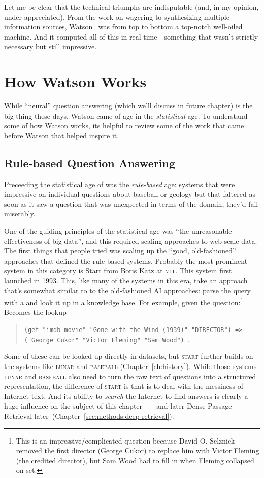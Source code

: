 Let me be clear that the technical triumphs are indisputable (and, in
my opinion, under-appreciated).
%
From the work on wagering to synthesizing multiple information sources,
Watson~\citep{ferruci-10} was from top to bottom a top-notch well-oiled
machine.
%
And it computed all of this in real time---something that wasn't
strictly necessary but still impressive.

\section{How Watson Works}

While ``neural'' question answering (which we'll discuss in future
chapter) is the big thing these days, Watson came of age in the
\emph{statistical} age.
%
To understand some of how Watson works, its helpful to review some of
the work that came before Watson that helped inspire it.

\subsection{Rule-based Question Answering}

Preceeding the statistical age of  was the \emph{rule-based}
age: systems that were impressive on individual questions about
baseball or geology but that faltered as soon as it saw a question
that was unexpected in terms of the domain, they'd fail miserably.

One of the guiding principles of the statistical age was ``the
unreasonable effectiveness of big data'', and this required scaling 
approaches to web-scale data.
%
The first things that people tried was scaling up the ``good,
old-fashioned'' approaches that defined the rule-based systems.
%
Probably the most prominent system in this category is Start from Boris Katz
at \textsc{mit}.  This system first launched in 1993.
%
This, like many of the systems in
this era, take an approach that’s somewhat similar to to the old-fashioned AI
approaches: parse the query with a and look it up in a knowledge base.
%
For example, given the question:\footnote{This is an impressive/complicated question
    because David O. Selznick removed the first director (George Cukor) to
    replace him with Victor Fleming (the credited director), but Sam Wood had
    to fill in when Fleming collapsed on set.}
%
%
Becomes the lookup
\begin{quote}
  \texttt{(get "imdb-movie" "Gone with the Wind (1939)" "DIRECTOR") =>
    ("George Cukor" "Victor Fleming" "Sam Wood")}~\citep{katz-02}.
\end{quote}
%
Some of these can be looked up directly in datasets, but \textsc{start}
further builds on the systems like \textsc{lunar} and \textsc{baseball}
(Chapter~\ref{ch:history}).
%
While those systems \textsc{lunar} and
\textsc{baseball} also need to turn the raw text of questions into a structured
representation, the difference of \textsc{start} is that
is to deal with the
messiness of Internet text.
%
And its ability to \emph{search} the
Internet to find answers is clearly a huge influence on the subject of this
chapter---\watson{}---and later Dense Passage
Retrieval later~(Chapter~\ref{sec:methods:deep-retrieval}).

